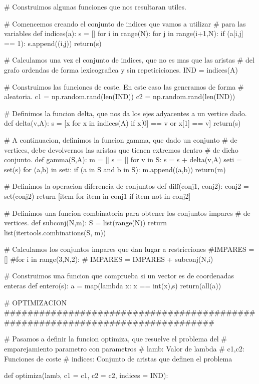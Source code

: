 \documentclass[twoside,a4paper,openright,12pt,tikz]{book}
\begin{document}
\begin{pythone}
# Construimos algunas funciones que nos resultaran utiles.

# Comencemos creando el conjunto de indices que vamos a utilizar
# para las variables
def indices(a):
    s = []
    for i in range(N):
        for j in range(i+1,N):
            if (a[i,j] == 1):
                s.append((i,j))
    return(s)

# Calculamos una vez el conjunto de indices, que no es mas que las aristas
# del grafo ordendas de forma lexicografica y sin repeticiciones.
IND = indices(A)

# Construimos las funciones de coste. En este caso las generamos de forma
# aleatoria.
c1 = np.random.rand(len(IND))
c2 = np.random.rand(len(IND))
    
# Definimos la funcion delta, que nos da los ejes adyacentes a un vertice dado.
def delta(v,A):
    s = [x for x in indices(A) if x[0] == v or x[1] == v]
    return(s)

# A continuacion, definimos la funcion gamma, que dado un conjunto
# de vertices, debe devolvernos las aristas que tienen extremos dentro
# de dicho conjunto.
def gamma(S,A):
    m = []
    s = []
    for v in S:
        s = s + delta(v,A)
    seti = set(s)
    for (a,b) in seti:
        if (a in S and b in S):
            m.append((a,b))
    return(m)
    
# Definimos la operacion diferencia de conjuntos
def diff(conj1, conj2):
        conj2 = set(conj2)
        return [item for item in conj1 if item not in conj2]
    
# Definimos una funcion combinatoria para obtener los conjuntos impares
# de vertices.
def subconj(N,m):
    S = list(range(N))
    return list(itertools.combinations(S, m))

# Calculamos los conjuntos impares que dan lugar a restricciones
#IMPARES = []
#for i in range(3,N,2):
#    IMPARES = IMPARES + subconj(N,i)

# Construimos una funcion que comprueba si un vector es de coordenadas enteras
def entero(s):
    a = map(lambda x: x == int(x),s)
    return(all(a))

# OPTIMIZACION
###############################################################################
    
# Pasamos a definir la funcion optimiza, que resuelve el problema del
# emparejamiento parametro con parametros
# lamb: Valor de lambda
# c1,c2: Funciones de coste
# indices: Conjunto de aristas que definen el problema

def optimiza(lamb, c1 = c1, c2 = c2, indices = IND):
    

\end{pythone}
\end{document}
